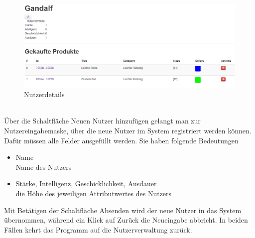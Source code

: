 \begin{figure}[h!]
  \centering
  \includegraphics[width=\textwidth]{img/Nutzerdetails.png}
  \caption{Nutzerdetails}
  \label{fig:Nutzerdetails}
\end{figure}
\text{}\vspace*{-1em}\\
Über die Schaltfläche Neuen Nutzer hinzufügen gelangt man zur Nutzereingabemaske, über die neue Nutzer im System registriert werden können. Dafür müssen alle Felder ausgefüllt werden. Sie haben folgende Bedeutungen
\begin{itemize}
  \item Name \\
        Name des Nutzers
  \vspace*{-0.5em}
  \item Stärke, Intelligenz, Geschicklichkeit, Ausdauer \\
        die Höhe des jeweiligen Attributwertes des Nutzers
\end{itemize}
Mit Betätigen der Schaltfläche Absenden wird der neue Nutzer in das System übernommen, während ein Klick auf Zurück die Neueingabe abbricht. In beiden Fällen kehrt das Programm auf die Nutzerverwaltung zurück.


